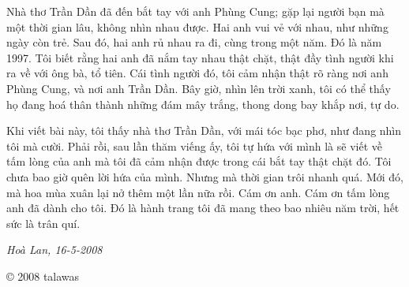 \documentclass[../main.tex]{subfiles}
\begin{document}
\begin{multicols}{2}
Nhà thơ Trần Dần đã đến bắt tay với anh Phùng Cung; gặp lại người bạn mà một thời gian lâu, không nhìn nhau được. Hai anh vui vẻ với nhau, như những ngày còn trẻ. Sau đó, hai anh rủ nhau ra đi, cùng trong một năm. Đó là năm 1997. Tôi biết rằng hai anh đã nắm tay nhau thật chặt, thật đầy tình người khi ra về với ông bà, tổ tiên. Cái tình người đó, tôi cảm nhận thật rõ ràng nơi anh Phùng Cung, và nơi anh Trần Dần. Bây giờ, nhìn lên trời xanh, tôi có thể thấy họ đang hoá thân thành những đám mây trắng, thong dong bay khắp nơi, tự do. 
 
Khi viết bài này, tôi thấy nhà thơ Trần Dần, với mái tóc bạc phơ, như đang nhìn tôi mà cười. Phải rồi, sau lần thăm viếng ấy, tôi tự hứa với mình là sẽ viết về tấm lòng của anh mà tôi đã cảm nhận được trong cái bắt tay thật chặt đó. Tôi chưa bao giờ quên lời hứa của mình. Nhưng mà thời gian trôi nhanh quá. Mới đó, mà hoa mùa xuân lại nở thêm một lần nữa rồi. Cám ơn anh. Cám ơn tấm lòng anh đã dành cho tôi. Đó là hành trang tôi đã mang theo bao nhiêu năm trời, hết sức là trân quí. 
 
\textit{Hoà Lan, 16-5-2008} 
 
© 2008 talawas 




\end{multicols}
\end{document}
